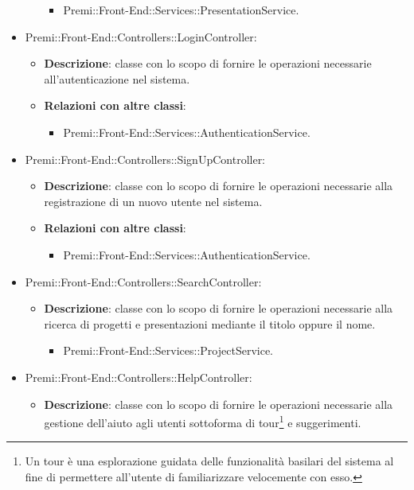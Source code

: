 \begin{itemize}
\begin{itemize}
\begin{itemize}
			\item Premi::Front-End::Services::PresentationService.
		\end{itemize}
	\end{itemize}
	\item  Premi::Front-End::Controllers::LoginController:
	\begin{itemize}
		\item \textbf{Descrizione}: classe con lo scopo di fornire le operazioni necessarie all'autenticazione nel sistema.
		\item \textbf{Relazioni con altre classi}:
		\begin{itemize}
			\item Premi::Front-End::Services::AuthenticationService.
		\end{itemize}
	\end{itemize}
	\item  Premi::Front-End::Controllers::SignUpController:
	\begin{itemize}
		\item \textbf{Descrizione}: classe con lo scopo di fornire le operazioni necessarie alla registrazione di un nuovo utente nel sistema.
		\item \textbf{Relazioni con altre classi}:
		\begin{itemize}
			\item Premi::Front-End::Services::AuthenticationService.
		\end{itemize}
	\end{itemize}
	\item  Premi::Front-End::Controllers::SearchController:
	\begin{itemize}
		\item \textbf{Descrizione}: classe con lo scopo di fornire le operazioni necessarie alla ricerca di progetti e presentazioni mediante il titolo oppure il nome.
		\begin{itemize}
			\item Premi::Front-End::Services::ProjectService.
		\end{itemize}
	\end{itemize}
	\item  Premi::Front-End::Controllers::HelpController:
	\begin{itemize}
		\item \textbf{Descrizione}: classe con lo scopo di fornire le operazioni necessarie alla gestione dell'aiuto agli utenti sottoforma di tour\footnote{Un tour è una esplorazione guidata delle funzionalità basilari del sistema al fine di permettere all'utente di familiarizzare velocemente con esso.} e suggerimenti.
	\end{itemize}
\end{itemize}
\newpage
